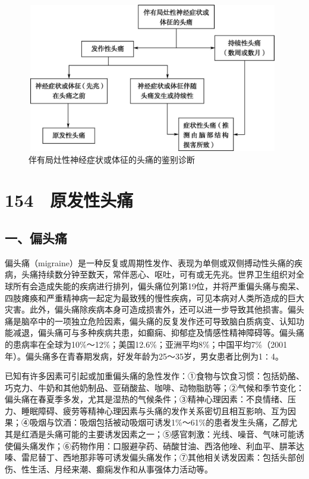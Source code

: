 \begin{figure}[!htbp]
 \centering
 \includegraphics[width=4.34375in,height=2.5625in]{./images/Image00277.jpg}
 \captionsetup{justification=centering}
 \caption{伴有局灶性神经症状或体征的头痛的鉴别诊断}
 \label{fig46-1}
  \end{figure} 

\protect\hypertarget{text00347.html}{}{}

\section{154　原发性头痛}

\subsection{一、偏头痛}

偏头痛（migraine）是一种反复或周期性发作、表现为单侧或双侧搏动性头痛的疾病，头痛持续数分钟至数天，常伴恶心、呕吐，可有或无先兆。世界卫生组织对全球所有会造成失能的疾病进行排列，偏头痛位列第19位，并将严重偏头痛与痴呆、四肢瘫痪和严重精神病一起定为最致残的慢性疾病，可见本病对人类所造成的巨大灾害。此外，偏头痛除疾病本身可造成损害外，还可以进一步导致其他损害。偏头痛是脑卒中的一项独立危险因素，偏头痛的反复发作还可导致脑白质病变、认知功能减退，偏头痛可与多种疾病共患，如癫痫、抑郁症及情感性精神障碍等。偏头痛的患病率在全球为10\%～12\%；美国12.6\%；亚洲平均8\%；中国平均7\%（2001年）。偏头痛多在青春期发病，好发年龄为25～35岁，男女患者比例为1∶4。

已知有许多因素可引起或加重偏头痛的急性发作：①食物与饮食习惯：包括奶酪、巧克力、牛奶和其他奶制品、亚硝酸盐、咖啡、动物脂肪等；②气候和季节变化：偏头痛在春夏季多发，尤其是湿热的气候条件；③精神心理因素：不良情绪、压力、睡眠障碍、疲劳等精神心理因素与头痛的发作关系密切且相互影响、互为因果；④吸烟与饮酒：吸烟包括被动吸烟可诱发1\%～61\%的患者发生头痛，乙醇尤其是红酒是头痛可能的主要诱发因素之一；⑤感官刺激：光线、噪音、气味可能诱使偏头痛发作；⑥药物作用：口服避孕药、硝酸甘油、西洛他唑、利血平、肼苯达嗪、雷尼替丁、西地那非等可诱发偏头痛发作；⑦其他相关诱发因素：包括头部创伤、性生活、月经来潮、癫痫发作和从事强体力活动等。

